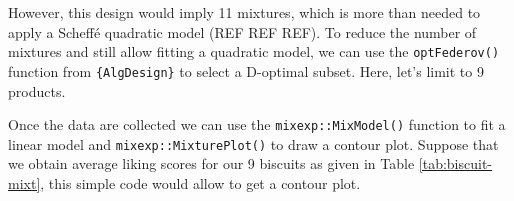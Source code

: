 \documentclass[
]{book}
\newenvironment{Shaded}{\begin{snugshade}}{\end{snugshade}}
\newcommand{\CommentTok}[1]{\textcolor[rgb]{0.56,0.35,0.01}{\textit{#1}}}
\newcommand{\FunctionTok}[1]{\textcolor[rgb]{0.00,0.00,0.00}{#1}}
\newcommand{\NormalTok}[1]{#1}
\begin{document}
However, this design would imply 11 mixtures, which is more than needed to apply a Scheffé quadratic model (REF REF REF). To reduce the number of mixtures and still allow fitting a quadratic model, we can use the \texttt{optFederov()} function from \texttt{\{AlgDesign\}} to select a D-optimal subset. Here, let's limit to 9 products.

\begin{Shaded}
\end{Shaded}

Once the data are collected we can use the \texttt{mixexp::MixModel()} function to fit a linear model and \texttt{mixexp::MixturePlot()} to draw a contour plot. Suppose that we obtain average liking scores for our 9 biscuits as given in Table \ref{tab:biscuit-mixt}, this simple code would allow to get a contour plot.

\providecommand{\docline}[3]{\noalign{\global\setlength{\arrayrulewidth}{#1}}\arrayrulecolor[HTML]{#2}\cline{#3}}

\setlength{\tabcolsep}{8pt}

\renewcommand*{\arraystretch}{1.5}
\end{document}
